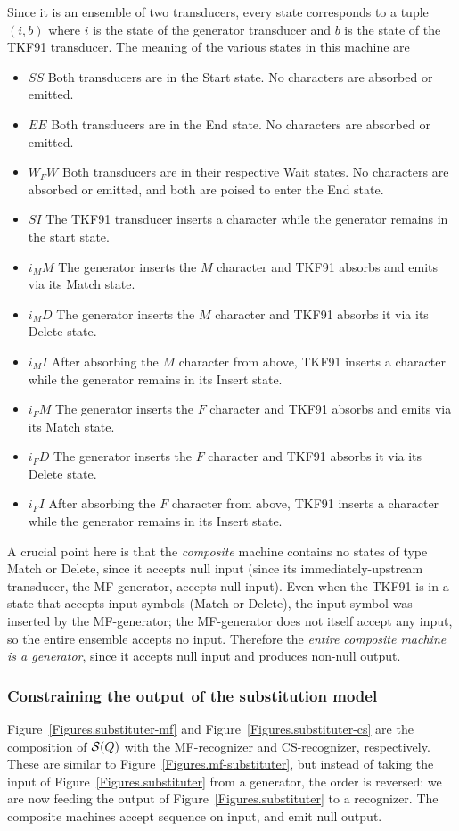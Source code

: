 \documentclass{article}
\newcommand{\figref}[1]{Figure~\ref{Figures.#1}}
\newcommand\substitute{{\cal S}}
\begin{document}
Since it is an ensemble of two transducers, every state corresponds to a tuple $(i,b)$
where
$i$ is the state of the generator transducer and
$b$ is the state of the TKF91 transducer.
The meaning of the various states in this machine are
\begin{itemize}
\item $SS$ Both transducers are in the Start state.  No characters are  absorbed or emitted.
\item $EE$ Both transducers are in the End state.  No characters are  absorbed or emitted.
\item $W_FW$ Both transducers are in their respective Wait states.  No characters are absorbed or emitted, and both are poised to enter the End state. 
\item $SI$ The TKF91 transducer inserts a character while the generator remains in the start state. 
\item $i_MM$ The  generator inserts the $M$ character and TKF91 absorbs and emits via its Match state.
\item $i_MD$ The  generator inserts the $M$ character and TKF91 absorbs it via its Delete state.
\item $i_MI$ After absorbing the $M$ character from above, TKF91 inserts a character while the generator remains in its Insert state. 
\item $i_FM$ The  generator inserts the $F$ character and TKF91 absorbs and emits via its Match state.
\item $i_FD$ The  generator inserts the $F$ character and TKF91 absorbs it via its Delete state.
\item $i_FI$ After absorbing the $F$ character from above, TKF91 inserts a character while the generator remains in its Insert state. 
\end{itemize}


A crucial point here is that the {\em composite} machine contains no states of
 type Match or Delete, since it accepts null input (since its immediately-upstream
transducer, the MF-generator, accepts null input).  
Even when the TKF91 is in a state that accepts input symbols (Match or Delete),
the input symbol was inserted by the MF-generator;
the MF-generator does not itself accept any input,
so the entire ensemble accepts no input.  
Therefore the {\em entire composite machine is a generator}, since it accepts null input
and produces non-null output.  


\subsubsection{Constraining the output of the substitution model}
\figref{substituter-mf}  and \figref{substituter-cs}  are the composition of $\substitute(Q)$ with the MF-recognizer and CS-recognizer, respectively.  
These are similar to 
\figref{mf-substituter},
but instead of taking the input of \figref{substituter} from a generator,
the order is reversed: we are now feeding the output of \figref{substituter} to a recognizer.
The composite machines accept sequence on input, and emit null output.
\end{document}
